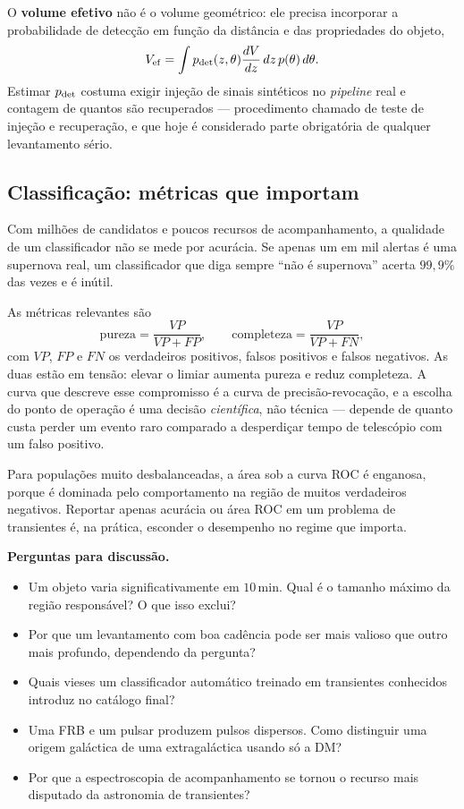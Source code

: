 \documentclass[11pt,a4paper]{article}
\begin{document}
O \textbf{volume efetivo} não é o volume geométrico: ele precisa incorporar a probabilidade de detecção em função da distância e das propriedades do objeto,
\[
V_{\rm ef}=\int p_{\rm det}(z,\theta)\frac{dV}{dz}\,dz\,p(\theta)\,d\theta.
\]
Estimar $p_{\rm det}$ costuma exigir injeção de sinais sintéticos no \textit{pipeline} real e contagem de quantos são recuperados --- procedimento chamado de teste de injeção e recuperação, e que hoje é considerado parte obrigatória de qualquer levantamento sério.

\subsection*{Classificação: métricas que importam}

Com milhões de candidatos e poucos recursos de acompanhamento, a qualidade de um classificador não se mede por acurácia. Se apenas um em mil alertas é uma supernova real, um classificador que diga sempre ``não é supernova'' acerta $99{,}9\%$ das vezes e é inútil.

As métricas relevantes são
\[
\text{pureza}=\frac{VP}{VP+FP},
\qquad
\text{completeza}=\frac{VP}{VP+FN},
\]
com $VP$, $FP$ e $FN$ os verdadeiros positivos, falsos positivos e falsos negativos. As duas estão em tensão: elevar o limiar aumenta pureza e reduz completeza. A curva que descreve esse compromisso é a curva de precisão-revocação, e a escolha do ponto de operação é uma decisão \emph{científica}, não técnica --- depende de quanto custa perder um evento raro comparado a desperdiçar tempo de telescópio com um falso positivo.

Para populações muito desbalanceadas, a área sob a curva ROC é enganosa, porque é dominada pelo comportamento na região de muitos verdadeiros negativos. Reportar apenas acurácia ou área ROC em um problema de transientes é, na prática, esconder o desempenho no regime que importa.

\textbf{Perguntas para discussão.}
\begin{itemize}
\item Um objeto varia significativamente em $10\,\mathrm{min}$. Qual é o tamanho máximo da região responsável? O que isso exclui?
\item Por que um levantamento com boa cadência pode ser mais valioso que outro mais profundo, dependendo da pergunta?
\item Quais vieses um classificador automático treinado em transientes conhecidos introduz no catálogo final?
\item Uma FRB e um pulsar produzem pulsos dispersos. Como distinguir uma origem galáctica de uma extragaláctica usando só a DM?
\item Por que a espectroscopia de acompanhamento se tornou o recurso mais disputado da astronomia de transientes?
\end{itemize}
\end{document}

